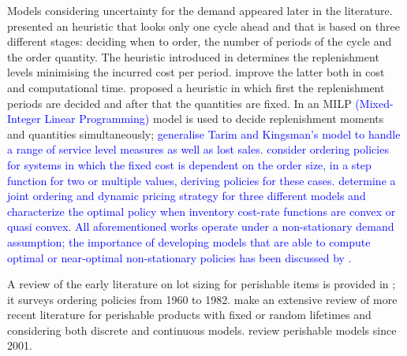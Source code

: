 \documentclass{tPRS2e}
\newcommand{\blue}{\textcolor{blue}}
\begin{document}
	Models considering uncertainty for the demand appeared later in the literature. \cite{citeulike:7292564} presented an heuristic that looks only one cycle ahead and that is based on three different stages: deciding when to order, the number of periods of the cycle and the order quantity. The heuristic introduced in \cite{Askin} determines the replenishment levels minimising the incurred cost per period. \cite{Bollapragada:1999} improve the latter both in cost and computational time.  \cite{BookbinderandTan} proposed a heuristic in which first the replenishment periods are decided and after that the quantities are fixed. In \cite{citeulike:12317242} an MILP \blue{(Mixed-Integer Linear Programming)} model is used to decide replenishment moments and quantities simultaneously; \blue{\cite{citeulike:13341691} generalise Tarim and Kingsman's model to handle a range of service level measures as well as lost sales. 
\blue{\cite{doi:10.1287/opre.1110.1033} consider ordering policies for systems in which the fixed cost is dependent on the order size, in a step function for two or multiple values, deriving policies for these cases. \cite{doi:10.1287/opre.2013.1238} determine a joint ordering and dynamic pricing strategy for three different models and characterize the optimal policy when inventory cost-rate functions are convex or quasi convex. }	
All aforementioned works operate under a non-stationary demand assumption; the importance of developing models that are able to compute optimal or near-optimal non-stationary policies has been discussed by \cite{citeulike:7928534}.}


	
%	
	A review of the early literature on lot sizing for perishable items is provided in \cite{citeulike:11825042}; it surveys ordering policies  from 1960 to 1982. \cite{citeulike:11825044} make an extensive review of more recent literature for perishable products with fixed or random lifetimes and considering both discrete and continuous models.  \cite{citeulike:10674763} review perishable models since 2001. 
\end{document}
